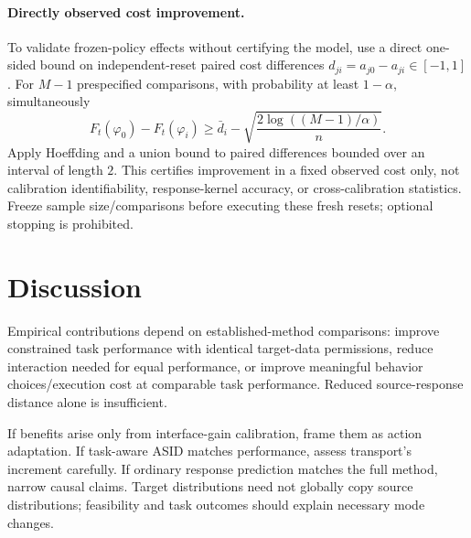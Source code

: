 \documentclass[11pt]{article}
\begin{document}
\paragraph{Directly observed cost improvement.}
To validate frozen-policy effects without certifying the model, use a direct one-sided
bound on independent-reset paired cost differences
$d_{ji}=a_{j0}-a_{ji}\in[-1,1]$. For $M-1$ prespecified comparisons, with probability
at least $1-\alpha$, simultaneously
\[
 F_t(\varphi_0)-F_t(\varphi_i)
 \ge \bar d_i-\sqrt{\frac{2\log((M-1)/\alpha)}{n}}.
\]
Apply Hoeffding and a union bound to paired differences bounded over an interval of
length $2$. This certifies improvement in a fixed observed cost only, not calibration
identifiability, response-kernel accuracy, or cross-calibration statistics. Freeze
sample size/comparisons before executing these fresh resets; optional stopping is prohibited.



\section{Discussion}
Empirical contributions depend on established-method comparisons: improve constrained
task performance with identical target-data permissions, reduce interaction needed
for equal performance, or improve meaningful behavior choices/execution cost at
comparable task performance. Reduced source-response distance alone is insufficient.

If benefits arise only from interface-gain calibration, frame them as action adaptation.
If task-aware ASID matches performance, assess transport's increment carefully.
If ordinary response prediction matches the full method, narrow causal claims.
Target distributions need not globally copy source distributions; feasibility and
task outcomes should explain necessary mode changes.
\end{document}
